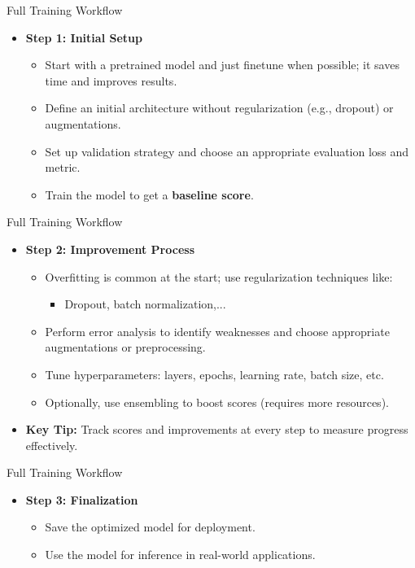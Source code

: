 \begin{frame}{Full Training Workflow}
\begin{itemize}
    \item \textbf{Step 1: Initial Setup}
    \begin{itemize}
        \item Start with a pretrained model and just finetune when possible; it saves time and improves results.
        \item Define an initial architecture without regularization (e.g., dropout) or augmentations.
        \item Set up validation strategy and choose an appropriate evaluation loss and metric.
        \item Train the model to get a \textbf{baseline score}.
    \end{itemize}
\end{itemize}
\end{frame}

\begin{frame}{Full Training Workflow}
\begin{itemize}
    \item \textbf{Step 2: Improvement Process}
    \begin{itemize}
        \item Overfitting is common at the start; use regularization techniques like:
        \begin{itemize}
            \item Dropout, batch normalization,...
        \end{itemize}
        \item Perform error analysis to identify weaknesses and choose appropriate augmentations or preprocessing.
        \item Tune hyperparameters: layers, epochs, learning rate, batch size, etc.
        \item Optionally, use ensembling to boost scores (requires more resources).
    \end{itemize}
    \item \textbf{Key Tip:} Track scores and improvements at every step to measure progress effectively.
\end{itemize}
\end{frame}

\begin{frame}{Full Training Workflow}
\begin{itemize}
    \item \textbf{Step 3: Finalization}
    \begin{itemize}
        \item Save the optimized model for deployment.
        \item Use the model for inference in real-world applications.
    \end{itemize}
\end{itemize}
\end{frame} 